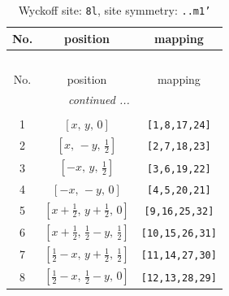 \documentclass[fleqn,8pt]{jsarticle}
\begin{document}
\begin{longtable}{ccc}
\caption{Wyckoff site: {\tt 8l}, site symmetry: {\tt ..m1'}}
 \\
 \hline \hline
No. & position & mapping \\ \hline \endfirsthead

\multicolumn{2}{l}{\tablename\ \thetable{}} \\
 \hline \hline
No. & position & mapping \\ \hline \endhead

 \hline \hline
\multicolumn{2}{r}{\footnotesize\it continued ...} \\ \endfoot

 \hline \hline
\multicolumn{2}{r}{} \\ \endlastfoot

1 & $\left[ x,\, y,\, 0 \right]$ & {\tt [1,8,17,24]} \\ \hline
2 & $\left[ x,\, - y,\, \frac{1}{2} \right]$ & {\tt [2,7,18,23]} \\ \hline
3 & $\left[ - x,\, y,\, \frac{1}{2} \right]$ & {\tt [3,6,19,22]} \\ \hline
4 & $\left[ - x,\, - y,\, 0 \right]$ & {\tt [4,5,20,21]} \\ \hline
5 & $\left[ x + \frac{1}{2},\, y + \frac{1}{2},\, 0 \right]$ & {\tt [9,16,25,32]} \\ \hline
6 & $\left[ x + \frac{1}{2},\, \frac{1}{2} - y,\, \frac{1}{2} \right]$ & {\tt [10,15,26,31]} \\ \hline
7 & $\left[ \frac{1}{2} - x,\, y + \frac{1}{2},\, \frac{1}{2} \right]$ & {\tt [11,14,27,30]} \\ \hline
8 & $\left[ \frac{1}{2} - x,\, \frac{1}{2} - y,\, 0 \right]$ & {\tt [12,13,28,29]} \\
\end{longtable}
\renewcommand{\arraystretch}{1.2}
\end{document}
